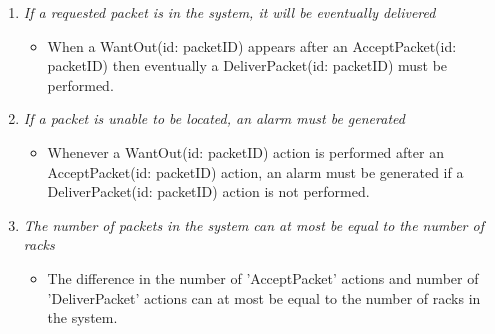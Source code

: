 \begin{enumerate}
\item \textit{If a requested packet is in the system, it will be
	eventually delivered}
	\begin{itemize}
	\item When a WantOut(id: packetID) appears after an AcceptPacket(id: 
	packetID) then eventually a DeliverPacket(id: packetID) must be
	performed.  
	\end{itemize}
	
\item \textit{If a packet is unable to be located, an alarm must 
	be generated}
	\begin{itemize}	
	\item  Whenever a WantOut(id: packetID) action is performed after an 
	AcceptPacket(id: packetID) action, an alarm must be generated if a 
	DeliverPacket(id: packetID) action is not performed.
	\end{itemize}
		
\item \textit{The number of packets in the system can at most be equal to the number of racks}
	\begin{itemize}
	\item The difference in the number of 'AcceptPacket'
	actions and number of 'DeliverPacket' actions can at most be 
	equal to the number of racks in the system.
	\end{itemize}
\end{enumerate}
